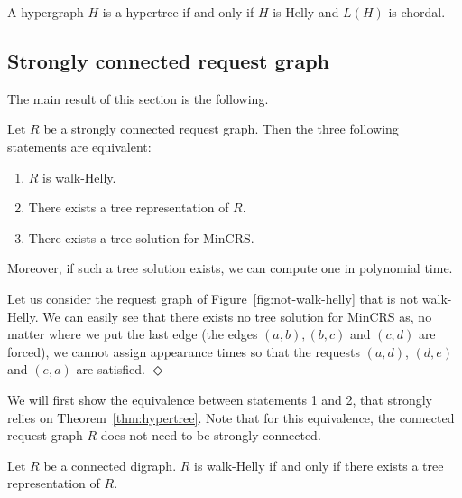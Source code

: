 \documentclass[11pt]{article}%
\begin{document}
    \begin{theorem}[Flament, 1978]
    \label{thm:hypertree}
    A hypergraph $H$ is a hypertree if and only if $H$ is Helly and $L(H)$ is chordal.
    \end{theorem}




\subsection{Strongly connected request graph}

The main result of this section is the following. 

\begin{theorem}
\label{thm:main}
Let $R$ be a strongly connected request graph. Then the three following statements are equivalent:
\begin{enumerate}
	\item $R$ is walk-Helly.
	\item There exists a tree representation of $R$.
	\item There exists a tree solution for MinCRS.
\end{enumerate}
Moreover, if such a tree solution exists, we can compute one in polynomial time. 
\end{theorem}

\begin{example} 
Let us consider the request graph of Figure~\ref{fig:not-walk-helly} that is not walk-Helly. 
We can easily see that there exists no tree solution for MinCRS as, no matter where we put the last edge (the edges $(a,b),(b,c)$ and $(c,d)$ are forced), we cannot assign appearance times so that the requests $(a,d)$, $(d,e)$ and $(e,a)$ are satisfied. \hfill{} $\Diamond$ 
\end{example}

We will first show the equivalence between statements 1 and 2, that strongly relies on Theorem~\ref{thm:hypertree}. Note that for this equivalence, the connected request graph $R$ does not need to be strongly connected.

\begin{proposition}
\label{prop:1-2}
Let $R$ be a connected digraph. $R$ is walk-Helly if and only if there exists a tree representation of $R$. 
\end{proposition}
\end{document}
